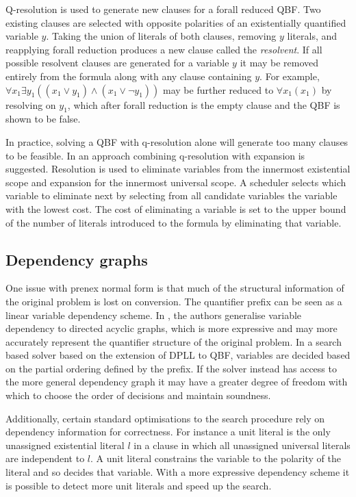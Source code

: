 Q-resolution is used to generate new clauses for a forall reduced QBF. Two existing clauses are selected with opposite polarities of an existentially quantified variable $y$. Taking the union of literals of both clauses, removing $y$ literals, and reapplying forall reduction produces a new clause called the \emph{resolvent}. If all possible resolvent clauses are generated for a variable $y$ it may be removed entirely from the formula along with any clause containing $y$. For example, $\forall x_1 \exists y_1 ((x_1 \lor y_1) \land (x_1 \lor \lnot y_1))$ may be further reduced to $\forall x_1 (x_1)$ by resolving on $y_1$, which after forall reduction is the empty clause and the QBF is shown to be false. 

In practice, solving a QBF with q-resolution alone will generate too many clauses to be feasible. In \cite{Biere05} an approach combining q-resolution with expansion is suggested. Resolution is used to eliminate variables from the innermost existential scope and expansion for the innermost universal scope. A scheduler selects which variable to eliminate next by selecting from all candidate variables the variable with the lowest cost. The cost of eliminating a variable is set to the upper bound of the number of literals introduced to the formula by eliminating that variable.

\subsection{Dependency graphs}

One issue with prenex normal form is that much of the structural information of the original problem is lost on conversion. The quantifier prefix can be seen as a linear variable dependency scheme. In \cite{Lonsing10}, the authors generalise variable dependency to directed acyclic graphs, which is more expressive and may more accurately represent the quantifier structure of the original problem. In a search based solver based on the extension of DPLL to QBF, variables are decided based on the partial ordering defined by the prefix. If the solver instead has access to the more general dependency graph it may have a greater degree of freedom with which to choose the order of decisions and maintain soundness.

Additionally, certain standard optimisations to the search procedure rely on dependency information for correctness. For instance a unit literal is the only unassigned existential literal $l$ in a clause in which all unassigned universal literals are independent to $l$. A unit literal constrains the variable to the polarity of the literal and so decides that variable. With a more expressive dependency scheme it is possible to detect more unit literals and speed up the search.

